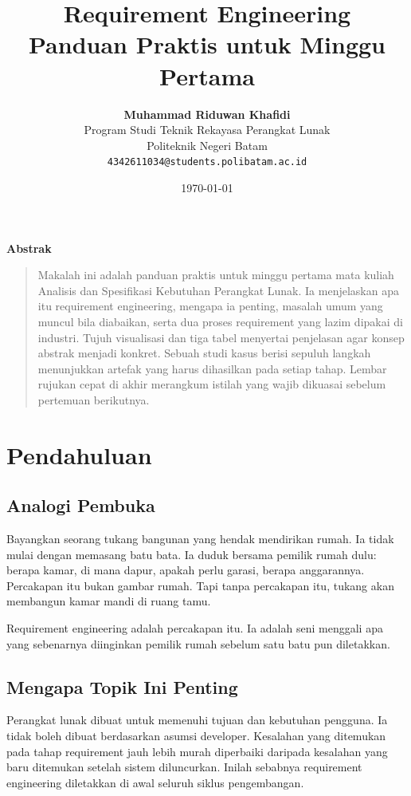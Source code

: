 \documentclass[11pt,a4paper]{article}
\title{\vspace{-1.5cm}\textbf{\sffamily\LARGE Requirement Engineering\\ Panduan Praktis untuk Minggu Pertama}}
\author{
	\textbf{Muhammad Riduwan Khafidi} \\
	\small Program Studi Teknik Rekayasa Perangkat Lunak \\
	\small Politeknik Negeri Batam \\
	\small \texttt{4342611034@students.polibatam.ac.id}
}
\date{\small\today}
\renewenvironment{abstract}
{\small
	\begin{center}\textbf{\sffamily Abstrak}\end{center}
	\begin{quote}}
	{\end{quote}}
\begin{document}
\maketitle
\thispagestyle{empty}

\begin{abstract}
	Makalah ini adalah panduan praktis untuk minggu pertama mata kuliah Analisis dan Spesifikasi Kebutuhan Perangkat Lunak. Ia menjelaskan apa itu requirement engineering, mengapa ia penting, masalah umum yang muncul bila diabaikan, serta dua proses requirement yang lazim dipakai di industri. Tujuh visualisasi dan tiga tabel menyertai penjelasan agar konsep abstrak menjadi konkret. Sebuah studi kasus berisi sepuluh langkah menunjukkan artefak yang harus dihasilkan pada setiap tahap. Lembar rujukan cepat di akhir merangkum istilah yang wajib dikuasai sebelum pertemuan berikutnya.
\end{abstract}

\section{Pendahuluan}

\subsection{Analogi Pembuka}

Bayangkan seorang tukang bangunan yang hendak mendirikan rumah. Ia tidak mulai dengan memasang batu bata. Ia duduk bersama pemilik rumah dulu: berapa kamar, di mana dapur, apakah perlu garasi, berapa anggarannya. Percakapan itu bukan gambar rumah. Tapi tanpa percakapan itu, tukang akan membangun kamar mandi di ruang tamu.

Requirement engineering adalah percakapan itu. Ia adalah seni menggali apa yang sebenarnya diinginkan pemilik rumah sebelum satu batu pun diletakkan.

\subsection{Mengapa Topik Ini Penting}

Perangkat lunak dibuat untuk memenuhi tujuan dan kebutuhan pengguna. Ia tidak boleh dibuat berdasarkan asumsi developer. Kesalahan yang ditemukan pada tahap requirement jauh lebih murah diperbaiki daripada kesalahan yang baru ditemukan setelah sistem diluncurkan. Inilah sebabnya requirement engineering diletakkan di awal seluruh siklus pengembangan.
\end{document}
